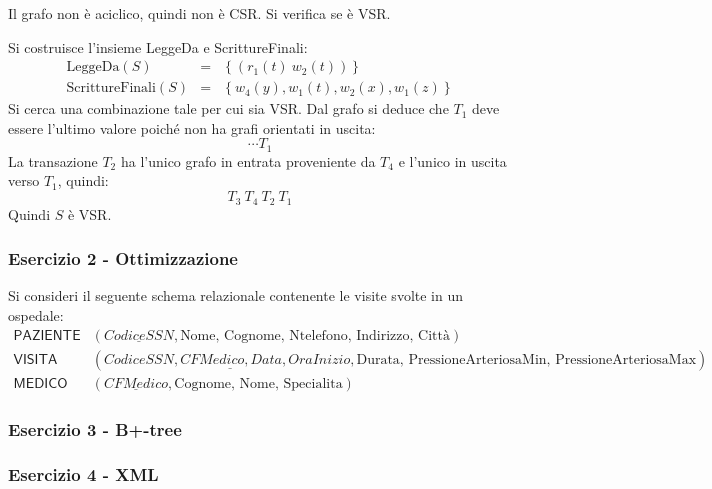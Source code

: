 \documentclass[a4paper]{article}
\begin{document}
	\noindent
	Il grafo non è aciclico, quindi non è CSR. Si verifica se è VSR.\newline

	\noindent
	Si costruisce l'insieme LeggeDa e ScrittureFinali:
	\begin{equation*}
		\begin{array}{lll}
			\text{LeggeDa}\left(S\right) 			&=& \left\{\left(r_{1}\left(t\right) \: w_{2}\left(t\right)\right)\right\} \\
			\text{ScrittureFinali}\left(S\right)	&=& \left\{w_{4}\left(y\right), w_{1}\left(t\right), w_{2}\left(x\right), w_{1}\left(z\right)\right\}
		\end{array}
	\end{equation*}
	Si cerca una combinazione tale per cui sia VSR. Dal grafo si deduce che $T_{1}$ deve essere l'ultimo valore poiché non ha grafi orientati in uscita:
	\begin{equation*}
		\cdots T_{1}
	\end{equation*}
	La transazione $T_{2}$ ha l'unico grafo in entrata proveniente da $T_{4}$ e l'unico in uscita verso $T_{1}$, quindi:
	\begin{equation*}
		T_{3} \: T_{4} \: T_{2} \: T_{1}
	\end{equation*}
	Quindi $S$ è VSR.\newpage

	\subsubsection{Esercizio 2 - Ottimizzazione}

	Si consideri il seguente schema relazionale contenente le visite svolte in un ospedale:
	\begin{equation*}
		\begin{array}{ll}
			\textsf{PAZIENTE} & \left(\underline{CodiceSSN}, \text{Nome, Cognome, Ntelefono, Indirizzo, Città}\right) \\
			\textsf{VISITA} & \left(\underline{CodiceSSN, CFMedico, Data, OraInizio,} \text{Durata, PressioneArteriosaMin, PressioneArteriosaMax}\right) \\
			\textsf{MEDICO} & \left(\underline{CFMedico}, \text{Cognome, Nome, Specialita}\right)
		\end{array}
	\end{equation*}
	
	\subsubsection{Esercizio 3 - B+-tree}
	
	\subsubsection{Esercizio 4 - XML}
\end{document}
